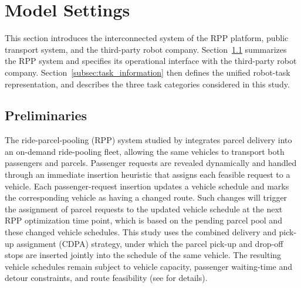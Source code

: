 \documentclass[11pt,oneside]{article}
\begin{document}


\section{Model Settings}

\noindent This section introduces the interconnected system of the RPP platform, public transport system, and the third-party robot company. Section~\ref{subsec:rpp_preliminaries} summarizes the
RPP system and specifies its operational interface with the third-party robot
company. Section~\ref{subsec:task_information} then defines the unified robot-task representation, and describes
the three task categories considered in this study.

\subsection{Preliminaries}
\label{subsec:rpp_preliminaries}

The ride-parcel-pooling (RPP) system studied by \citet{FehnEtAl2023}
integrates parcel delivery into an on-demand ride-pooling fleet, allowing the
same vehicles to transport both passengers and parcels. Passenger requests are
revealed dynamically and handled through an immediate
insertion heuristic that assigns each feasible request to a vehicle. Each passenger-request insertion updates a vehicle schedule and marks the
corresponding vehicle as having a changed route. Such changes will trigger the assignment of parcel requests to the updated vehicle schedule at the next RPP optimization time point, which is based on the pending parcel pool and these changed vehicle schedules. This
study uses the combined delivery and pick-up assignment (CDPA) strategy, under which the parcel
pick-up and drop-off stops are inserted jointly into the schedule of the same
vehicle. The resulting vehicle schedules remain subject to vehicle capacity,
passenger waiting-time and detour constraints, and route feasibility (see
\citet{FehnEtAl2023} for details).
\end{document}
